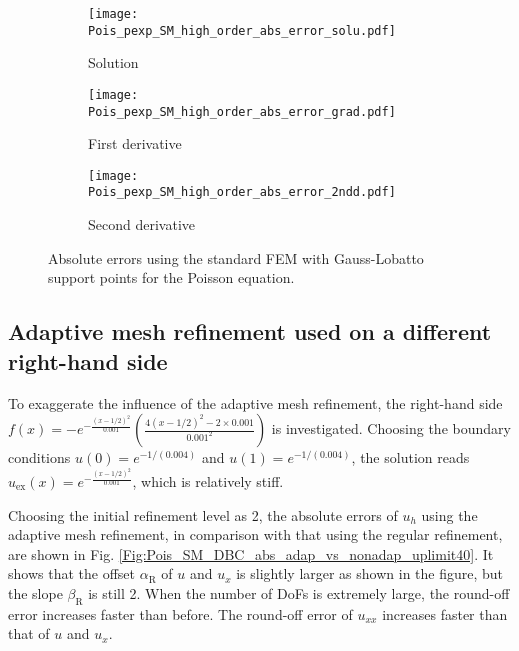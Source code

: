 \documentclass[final,3p]{elsarticle}
\begin{document}
\begin{figure}[!ht]
    \begin{subfigure}{5.5cm}
        \texttt{[image: Pois\_pexp\_SM\_high\_order\_abs\_error\_solu.pdf]}
        \caption{Solution}
        \label{Fig:Pois_pexp_SM_high_order_abs_error_solu}
    \end{subfigure}
    \begin{subfigure}{5.5cm}
        \texttt{[image: Pois\_pexp\_SM\_high\_order\_abs\_error\_grad.pdf]}
        \caption{First derivative}
        \label{Fig:Pois_pexp_SM_high_order_abs_error_grad}
    \end{subfigure}
    \begin{subfigure}{5.5cm}
        \texttt{[image: Pois\_pexp\_SM\_high\_order\_abs\_error\_2ndd.pdf]}
        \caption{Second derivative}
        \label{Fig:Pois_pexp_SM_high_order_abs_error_2ndd}
    \end{subfigure}
\caption{Absolute errors using the standard FEM with Gauss-Lobatto support points for the Poisson equation.}
\label{Fig:Pois_pexp_SM_high_order_abs_error}
\end{figure}

\subsection{Adaptive mesh refinement used on a different right-hand side}	\label{influence_rhs_amr}

To exaggerate the influence of the adaptive mesh refinement, the right-hand side $f(x)=-e^{- \frac{(x-1/2)^2}{0.001}} \left( \frac{4(x-1/2)^2-2\times0.001}{0.001^2} \right)$ is investigated. Choosing the boundary conditions $u(0)=e^{-1/{(0.004)}}$ and $u(1)=e^{-1/{(0.004)}}$, the solution reads $u_{\text{ex}}(x)=e^{- \frac{(x-1/2)^2}{0.001}}$, which is relatively stiff.

Choosing the initial refinement level as 2, the absolute errors of $u_h$ using the adaptive mesh refinement, in comparison with that using the regular refinement, are shown in Fig. \ref{Fig:Pois_SM_DBC_abs_adap_vs_nonadap_uplimit40}. It shows that the offset $\alpha_{\text{R}}$ of $u$ and $u_x$ is slightly larger as shown in the figure, but the slope $\beta _{\text{R}}$ is still 2.
When the number of DoFs is extremely large, the round-off error increases faster than before.
The round-off error of $u_{xx}$ increases faster than that of $u$ and $u_x$.
\end{document}
